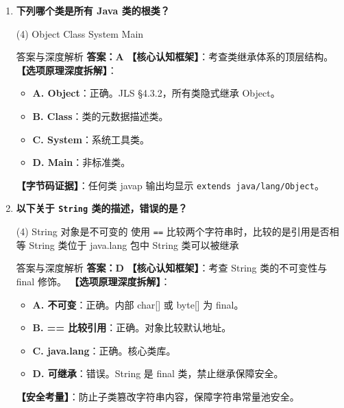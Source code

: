 ﻿\documentclass[12pt, a4paper]{ctexart}
\newcommand{\code}[1]{\texttt{#1}}
\begin{document}
\begin{enumerate}[label=\textbf{\arabic*.}, itemsep=1em]
	\item \textbf{下列哪个类是所有 Java 类的根类？}
	      \begin{tasks}(4)
		      \task Object \task Class \task System \task Main
	      \end{tasks}
	      \begin{bluebox}{答案与深度解析}
		      \textbf{答案：A}
		      \textbf{【核心认知框架】}：考查类继承体系的顶层结构。
		      \textbf{【选项原理深度拆解】}：
		      \begin{itemize}[leftmargin=*, nosep]
			      \item \textbf{A. Object}：正确。JLS §4.3.2，所有类隐式继承 Object。
			      \item \textbf{B. Class}：类的元数据描述类。
			      \item \textbf{C. System}：系统工具类。
			      \item \textbf{D. Main}：非标准类。
		      \end{itemize}
		      \textbf{【字节码证据】}：任何类 javap 输出均显示 \code{extends java/lang/Object}。
	      \end{bluebox}

	\item \textbf{以下关于 \code{String} 类的描述，错误的是？}
	      \begin{tasks}(4)
		      \task String 对象是不可变的 \task 使用 \code{==} 比较两个字符串时，比较的是引用是否相等
		      \task String 类位于 java.lang 包中 \task String 类可以被继承
	      \end{tasks}
	      \begin{bluebox}{答案与深度解析}
		      \textbf{答案：D}
		      \textbf{【核心认知框架】}：考查 String 类的不可变性与 final 修饰。
		      \textbf{【选项原理深度拆解】}：
		      \begin{itemize}[leftmargin=*, nosep]
			      \item \textbf{A. 不可变}：正确。内部 char[] 或 byte[] 为 final。
			      \item \textbf{B. == 比较引用}：正确。对象比较默认地址。
			      \item \textbf{C. java.lang}：正确。核心类库。
			      \item \textbf{D. 可继承}：错误。String 是 final 类，禁止继承保障安全。
		      \end{itemize}
		      \textbf{【安全考量】}：防止子类篡改字符串内容，保障字符串常量池安全。
	      \end{bluebox}


\end{enumerate}
\end{document}
